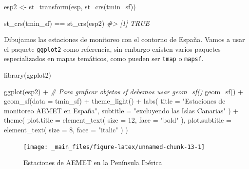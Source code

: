 \documentclass[
]{book}
\newenvironment{Shaded}{\begin{snugshade}}{\end{snugshade}}
\newcommand{\AttributeTok}[1]{\textcolor[rgb]{0.77,0.63,0.00}{#1}}
\newcommand{\CommentTok}[1]{\textcolor[rgb]{0.56,0.35,0.01}{\textit{#1}}}
\newcommand{\DecValTok}[1]{\textcolor[rgb]{0.00,0.00,0.81}{#1}}
\newcommand{\FunctionTok}[1]{\textcolor[rgb]{0.00,0.00,0.00}{#1}}
\newcommand{\NormalTok}[1]{#1}
\newcommand{\OtherTok}[1]{\textcolor[rgb]{0.56,0.35,0.01}{#1}}
\newcommand{\SpecialCharTok}[1]{\textcolor[rgb]{0.00,0.00,0.00}{#1}}
\newcommand{\StringTok}[1]{\textcolor[rgb]{0.31,0.60,0.02}{#1}}
\begin{document}
\begin{Shaded}
\begin{Highlighting}[]
\NormalTok{esp2 }\OtherTok{\textless{}{-}} \FunctionTok{st\_transform}\NormalTok{(esp, }\FunctionTok{st\_crs}\NormalTok{(tmin\_sf))}

\FunctionTok{st\_crs}\NormalTok{(tmin\_sf) }\SpecialCharTok{==} \FunctionTok{st\_crs}\NormalTok{(esp2)}
\CommentTok{\#\textgreater{} [1] TRUE}
\end{Highlighting}
\end{Shaded}

Dibujamos las estaciones de monitoreo con el contorno de España. Vamos a usar el
paquete \texttt{ggplot2} como referencia, sin embargo existen varios paquetes
especializados en mapas temáticos, como pueden ser \texttt{tmap} o \texttt{mapsf}.

\begin{Shaded}
\begin{Highlighting}[]
\FunctionTok{library}\NormalTok{(ggplot2)}

\FunctionTok{ggplot}\NormalTok{(esp2) }\SpecialCharTok{+}
  \CommentTok{\# Para graficar objetos sf debemos usar geom\_sf()}
  \FunctionTok{geom\_sf}\NormalTok{() }\SpecialCharTok{+}
  \FunctionTok{geom\_sf}\NormalTok{(}\AttributeTok{data =}\NormalTok{ tmin\_sf) }\SpecialCharTok{+}
  \FunctionTok{theme\_light}\NormalTok{() }\SpecialCharTok{+}
  \FunctionTok{labs}\NormalTok{(}
    \AttributeTok{title =} \StringTok{"Estaciones de monitoreo AEMET en  España"}\NormalTok{,}
    \AttributeTok{subtitle =} \StringTok{"excluyendo las Islas Canarias"}
\NormalTok{  ) }\SpecialCharTok{+}
  \FunctionTok{theme}\NormalTok{(}
    \AttributeTok{plot.title =} \FunctionTok{element\_text}\NormalTok{(}
      \AttributeTok{size =} \DecValTok{12}\NormalTok{,}
      \AttributeTok{face =} \StringTok{"bold"}
\NormalTok{    ),}
    \AttributeTok{plot.subtitle =} \FunctionTok{element\_text}\NormalTok{(}
      \AttributeTok{size =} \DecValTok{8}\NormalTok{,}
      \AttributeTok{face =} \StringTok{"italic"}
\NormalTok{    )}
\NormalTok{  )}
\end{Highlighting}
\end{Shaded}

\begin{figure}

{\centering \texttt{[image: \_main\_files/figure-latex/unnamed-chunk-13-1]} 

}

\caption{Estaciones de AEMET en la Península Ibérica}\label{fig:unnamed-chunk-13}
\end{figure}
\end{document}
